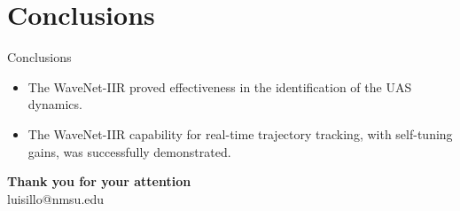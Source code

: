 \documentclass{beamer}
\begin{document}




\section{Conclusions}

\begin{frame}{Conclusions}
    
    

                \begin{itemize}
                \item The WaveNet-IIR proved effectiveness in the identification of the UAS dynamics.
                \item The WaveNet-IIR capability for real-time trajectory tracking, with self-tuning gains, was successfully demonstrated.
                 \end{itemize}
\end{frame}


        \begin{frame}
             
       
                \begin{center}
                \textbf{\Huge Thank you for your attention}\\
                luisillo@nmsu.edu \\
                \end{center}

        \end{frame}
	
	
	
\end{document}
